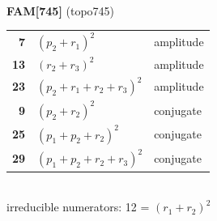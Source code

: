 \documentclass[10pt]{article}
\begin{document}
\begin{minipage}[t]{0.48\textwidth}
{}\\[2mm]\textbf{FAM[745]} (topo745)\\[2pt]{\footnotesize\begin{tabular}{@{}r@{\ \ }l@{\ \ }l@{}}\textbf{7} & $(p_2+r_1)^2$ & amplitude\\
\textbf{13} & $(r_2+r_3)^2$ & amplitude\\
\textbf{23} & $(p_2+r_1+r_2+r_3)^2$ & amplitude\\
\textbf{9} & $(p_2+r_2)^2$ & conjugate\\
\textbf{25} & $(p_1+p_2+r_2)^2$ & conjugate\\
\textbf{29} & $(p_1+p_2+r_2+r_3)^2$ & conjugate\\\end{tabular}}\\[2pt]{\scriptsize irreducible numerators: 12 = $(r_1+r_2)^2$}\end{minipage}\hfill%
\end{document}
